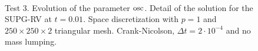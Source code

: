 \begin{figure}%
\centering
{}%
\\%
\caption{Test 3. Evolution of the parameter ${\rm osc}$. Detail of the solution for the SUPG-RV at $t=0.01$. Space discretization with $p=1$ and $250\times 250 \times 2$ triangular mesh. Crank-Nicolson, $\Delta t = 2 \cdot 10^{-4}$ and no mass lumping.}\label{fig-osctime}
\end{figure}

